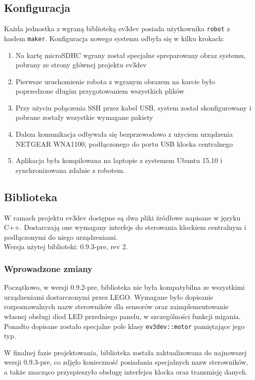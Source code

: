 \subsection{Konfiguracja}

Każda jednostka z wgraną biblioteką ev3dev posiada użytkownika {\tt robot} z hasłem {\tt maker}. Konfiguracja nowego systemu odbyła się w kilku krokach:

\begin{enumerate}
    \item Na kartę microSDHC wgrany został specjalne spreparowany obraz systemu, pobrany ze strony głównej projektu ev3dev
    \item Pierwsze uruchomienie robota z wgranym obrazem na karcie było poprzedzone długim przygotowaniem wszystkich plików
    \item Przy użyciu połączenia SSH przez kabel USB, system został skonfigurowany i pobrane zostały wszystkie wymagane pakiety
    \item Dalsza komunikacja odbywała się bezprzewodowo z użyciem urządzenia NETGEAR WNA1100, podłączonego do portu USB klocka centralnego
    \item Aplikacja była kompilowana na laptopie z systemem Ubuntu 15.10 i synchronizowana zdalnie z robotem.
\end{enumerate}

\subsection{Biblioteka}
W ramach projektu ev3dev dostępne są dwa pliki źródłowe napisane w języku C++. Dostarczają one wymagany interfejs do sterowania klockiem centralnym i\,podłączonymi do niego urządzeniami.\\

\noindent Wersja użytej biblioteki: 0.9.3-pre, rev 2.

\subsubsection{Wprowadzone zmiany}
Początkowo, w wersji 0.9.2-pre, biblioteka nie była kompatybilna ze wszystkimi urządzeniami dostarczonymi przez LEGO. Wymagane było dopisanie rozpoznawalnych nazw sterowników dla sensorów oraz zaimplementowanie własnej obsługi diod LED przedniego panelu, w szczególności funkcji migania. Ponadto dopisane zostało specjalne pole klasy {\tt ev3dev::motor} pamiętające jego typ.

W finalnej fazie projektowania, biblioteka została zaktualizowana do najnowszej wersji 0.9.3-pre, co zdjęło konieczność posiadania specjalnych nazw sterowników, a także znacząco przyspieszyło obsługę interfejsu klocka oraz transmisję danych.

